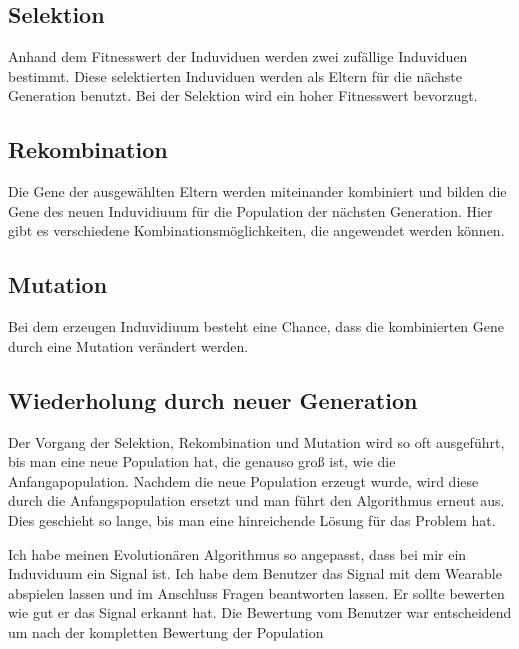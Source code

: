 \subsection{Selektion}
\label{ch:Grundlagen:sec:Selektion}
Anhand dem Fitnesswert der Induviduen werden zwei zuf{\"a}llige Induviduen bestimmt. Diese selektierten Induviduen werden als Eltern f{\"u}r die n{\"a}chste Generation benutzt.
Bei der Selektion wird ein hoher Fitnesswert bevorzugt.

\subsection{Rekombination}
\label{ch:Grundlagen:sec:Rekombination}
Die Gene der ausgew{\"a}hlten Eltern werden miteinander kombiniert und bilden die Gene des neuen Induvidiuum f{\"u}r die Population der n{\"a}chsten Generation. Hier gibt es verschiedene Kombinationsm{\"o}glichkeiten, die angewendet werden k{\"o}nnen.

\subsection{Mutation}
\label{ch:Grundlagen:sec:Mutation}
Bei dem erzeugen Induvidiuum besteht eine Chance, dass die kombinierten Gene durch eine Mutation ver{\"a}ndert werden. 

\subsection{Wiederholung durch neuer Generation}
\label{ch:Grundlagen:sec:Wiederholung durch neuer Generation}
Der Vorgang der Selektion, Rekombination und Mutation wird so oft ausgef{\"u}hrt, bis man eine neue Population hat, die genauso gro{\ss} ist, wie die Anfangapopulation.
Nachdem die neue Population erzeugt wurde, wird diese durch die Anfangspopulation ersetzt und man f{\"u}hrt den Algorithmus erneut aus. 
Dies geschieht so lange, bis man eine hinreichende L{\"o}sung für das Problem hat. 




Ich habe meinen Evolution{\"a}ren Algorithmus so angepasst, dass bei mir ein Induviduum ein Signal ist. 
Ich habe dem Benutzer das Signal mit dem Wearable abspielen lassen und im Anschluss Fragen beantworten lassen. 
Er sollte bewerten wie gut er das Signal erkannt hat. Die Bewertung vom Benutzer war entscheidend um nach der kompletten Bewertung der Population 